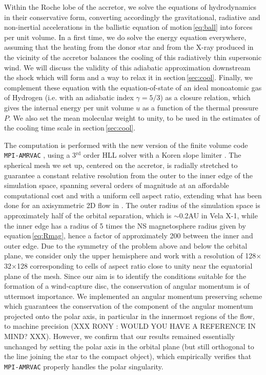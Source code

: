 \documentclass{aa}
\makeatletter
\newcommand*{\ns}{NS\@\xspace}
\newcommand*{\ie}{i.e.\@\xspace}
\makeatother
\begin{document}
Within the Roche lobe of the accretor, we solve the equations of hydrodynamics in their conservative form, converting accordingly the gravitational, radiative and non-inertial accelerations in the ballistic equation of motion\,\eqref{eq:ball} into forces per unit volume. In a first time, we do solve the energy equation everywhere, assuming that the heating from the donor star and from the X-ray produced in the vicinity of the accretor balances the cooling of this radiatively thin supersonic wind. We will discuss the validity of this adiabatic approximation downstream the shock which will form and a way to relax it in section\,\ref{sec:cool}. Finally, we complement these equation with the equation-of-state of an ideal monoatomic gas of Hydrogen (\ie with an adiabatic index $\gamma=5/3$) as a closure relation, which gives the internal energy per unit volume $u$ as a function of the thermal pressure $P$. We also set the mean molecular weight to unity, to be used in the estimates of the cooling time scale in section\,\ref{sec:cool}.

The computation is performed with the new version of the finite volume code \texttt{MPI-AMRVAC} \citep{Xia2017}, using a 3$^{\text{rd}}$ order HLL solver \citep{Toro1994} with a Koren slope limiter \citep{Vreugdenhil1993}. The spherical mesh we set up, centered on the accretor, is radially stretched to guarantee a constant relative resolution from the outer to the inner edge of the simulation space, spanning several orders of magnitude at an affordable computational cost and with a uniform cell aspect ratio, extending what has been done for an axisymmetric 2D flow in \cite{ElMellah2015}. The outer radius of the simulation space is approximately half of the orbital separation, which is $\sim$0.2AU in Vela X-1, while the inner edge has a radius of 5 times the \ns magnetosphere radius given by equation\,\eqref{eq:Rmag}, hence a factor of approximately 200 between the inner and outer edge. Due to the symmetry of the problem above and below the orbital plane, we consider only the upper hemisphere and work with a resolution of 128$\times$32$\times$128 corresponding to cells of aspect ratio close to unity near the equatorial plane of the mesh. Since our aim is to identify the conditions suitable for the formation of a wind-capture disc, the conservation of angular momentum is of uttermost importance. We implemented an angular momentum preserving scheme which guarantees the conservation of the component of the angular momentum projected onto the polar axis, in particular in the innermost regions of the flow, to machine precision (XXX RONY : WOULD YOU HAVE A REFERENCE IN MIND? XXX). However, we confirm that our results remained essentially unchanged by setting the polar axis in the orbital plane (but still orthogonal to the line joining the star to the compact object), which empirically verifies that \texttt{MPI-AMRVAC} properly handles the polar singularity.
\end{document}

